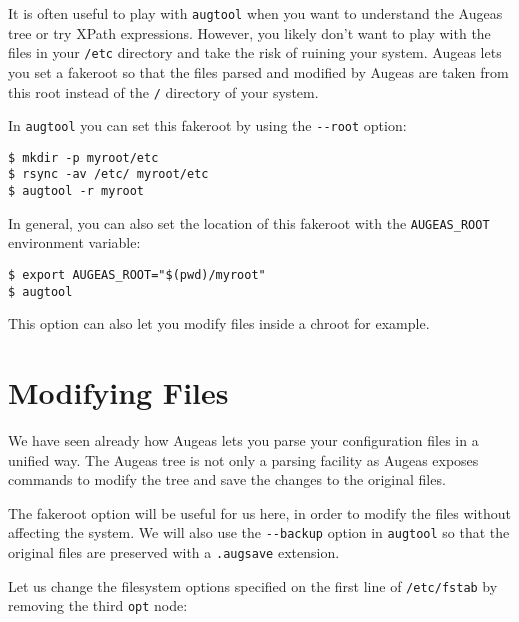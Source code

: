It is often useful to play with \verb!augtool! when you want to understand the Augeas tree or try XPath expressions. However, you likely don't want to play with the files in your \verb!/etc! directory and take the risk of ruining your system. Augeas lets you set a fakeroot so that the files parsed and modified by Augeas are taken from this root instead of the \verb!/! directory of your system.

 

In \verb!augtool! you can set this fakeroot by using the \verb!--root! option:

\begin{verbatim}
$ mkdir -p myroot/etc
$ rsync -av /etc/ myroot/etc
$ augtool -r myroot
\end{verbatim}

In general, you can also set the location of this fakeroot with the \verb!AUGEAS_ROOT! environment variable:

\begin{verbatim}
$ export AUGEAS_ROOT="$(pwd)/myroot"
$ augtool
\end{verbatim}

This option can also let you modify files inside a chroot for example.

\section{Modifying Files}

We have seen already how Augeas lets you parse your configuration files in a unified way. The Augeas tree is not only a parsing facility as Augeas exposes commands to modify the tree and save the changes to the original files.

The fakeroot option will be useful for us here, in order to modify the files without affecting the system. We will also use the \verb!--backup! option in \verb!augtool! so that the original files are preserved with a \verb!.augsave! extension.

     

Let us change the filesystem options specified on the first line of \verb!/etc/fstab! by removing the third \verb!opt! node:

